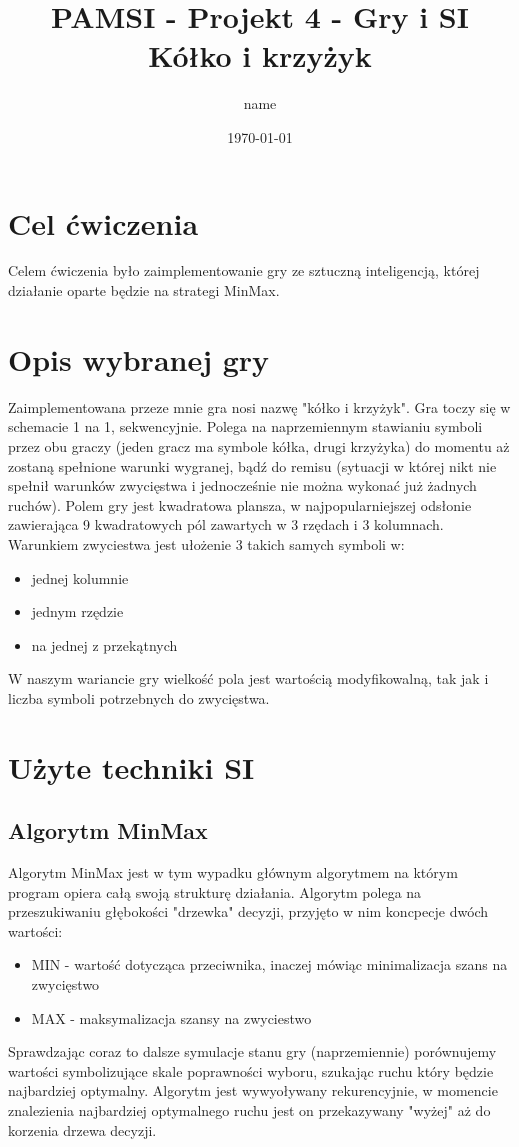 \documentclass[10pt,a4paper]{article} %
\begin{document}
\title{PAMSI - Projekt 4 - Gry i SI \\
	   \large Kółko i krzyżyk}
\author{name}
\date{\today}
\maketitle
\tableofcontents
	\newpage
	\section{Cel ćwiczenia} 
	Celem ćwiczenia było zaimplementowanie gry ze sztuczną inteligencją, której działanie oparte będzie na strategi MinMax.
	\section{Opis wybranej gry}
	Zaimplementowana przeze mnie gra nosi nazwę "kółko i krzyżyk". Gra toczy się w schemacie 1 na 1, sekwencyjnie. Polega na naprzemiennym stawianiu symboli przez obu graczy (jeden gracz ma symbole kółka, drugi krzyżyka) do momentu aż zostaną spełnione warunki wygranej, bądź do remisu (sytuacji w której nikt nie spełnił warunków zwycięstwa i jednocześnie nie można wykonać już żadnych ruchów). Polem gry jest kwadratowa plansza, w najpopularniejszej odsłonie zawierająca 9 kwadratowych pól zawartych w 3 rzędach i 3 kolumnach. Warunkiem zwyciestwa jest ułożenie 3 takich samych symboli w:
	\begin{itemize}
		\item jednej kolumnie
		\item jednym rzędzie
		\item na jednej z przekątnych
	\end{itemize}
	W naszym wariancie gry wielkość pola jest wartością modyfikowalną, tak jak i liczba symboli potrzebnych do zwycięstwa.
	\section{Użyte techniki SI}
	\subsection{Algorytm MinMax}
	Algorytm MinMax jest w tym wypadku głównym algorytmem na którym program opiera całą swoją strukturę działania.
	Algorytm polega na przeszukiwaniu głębokości "drzewka" decyzji, przyjęto w nim koncpecje dwóch wartości:
	\begin{itemize}
		\item MIN - wartość dotycząca przeciwnika, inaczej mówiąc minimalizacja szans na zwycięstwo
		\item MAX - maksymalizacja szansy na zwyciestwo
	\end{itemize}
	Sprawdzając coraz to dalsze symulacje stanu gry (naprzemiennie) porównujemy wartości symbolizujące skale poprawności wyboru, szukając ruchu który będzie najbardziej optymalny. Algorytm jest wywyoływany rekurencyjnie, w momencie znalezienia najbardziej optymalnego ruchu jest on przekazywany "wyżej" aż do 
	korzenia drzewa decyzji.
\end{document}
